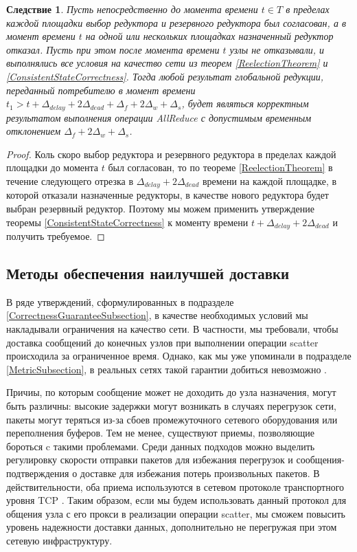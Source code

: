 \documentclass{article}
\theoremstyle{plain}
\theoremstyle{plain}
\newtheorem{consequence}[theorem]{Следствие}
\theoremstyle{plain}
\theoremstyle{plain}
\theoremstyle{definition}
\theoremstyle{remark}
\theoremstyle{plain}
\begin{document}
\begin{consequence}
    Пусть непосредственно до момента времени $t \in T$ в пределах каждой площадки выбор редуктора и резервного редуктора был согласован, а в момент времени $t$ на одной или нескольких площадках назначенный редуктор отказал. Пусть при этом после момента времени $t$ узлы не отказывали, и выполнялись все условия на качество сети из теорем \ref{ReelectionTheorem} и \ref{ConsistentStateCorrectness}. Тогда любой результат глобальной редукции, переданный потребителю в момент времени $t_1 > t + \Delta_{delay} + 2\Delta_{dead} + \Delta_f + 2\Delta_w + \Delta_s$, будет являться корректным результатом выполнения операции AllReduce с допустимым временным отклонением $\Delta_f + 2\Delta_w + \Delta_s$.
\end{consequence}
\begin{proof}
    Коль скоро выбор редуктора и резервного редуктора в пределах каждой площадки до момента $t$ был согласован, то по теореме \ref{ReelectionTheorem} в течение следующего отрезка в $\Delta_{delay} + 2\Delta_{dead}$ времени на каждой площадке, в которой отказали назначенные редукторы, в качестве нового редуктора будет выбран резервный редуктор. Поэтому мы можем применить утверждение теоремы \ref{ConsistentStateCorrectness} к моменту времени $t + \Delta_{delay} + 2\Delta_{dead}$ и получить требуемое.
\end{proof}

\subsection{Методы обеспечения наилучшей доставки}
\label{BestEffortDeliverySubsection}

В ряде утверждений, сформулированных в подразделе \ref{CorrectnessGuaranteeSubsection}, в качестве необходимых условий мы накладывали ограничения на качество сети. В частности, мы требовали, чтобы доставка сообщений до конечных узлов при выполнении операции scatter происходила за ограниченное время. Однако, как мы уже упоминали в подразделе \ref{MetricSubsection}, в реальных сетях такой гарантии добиться невозможно \cite{networking:best-effort-service}.

Причиы, по которым сообщение может не доходить до узла назначения, могут быть различны: высокие задержки могут возникать в случаях перегрузок сети, пакеты могут теряться из-за сбоев промежуточного сетевого оборудования или переполнения буферов. Тем не менее, существуют приемы, позволяющие бороться c такими проблемами. Среди данных подходов можно выделить регулировку скорости отправки пакетов для избежания перегрузок и сообщения-подтверждения о доставке для избежания потерь произвольных пакетов. В действительности, оба приема используются в сетевом протоколе транспортного уровня TCP \cite{RFC0793, RFC5681}. Таким образом, если мы будем использовать данный протокол для общения узла с его прокси в реализации операции scatter, мы сможем повысить уровень надежности доставки данных, дополнительно не перегружая при этом сетевую инфраструктуру.
\end{document}
